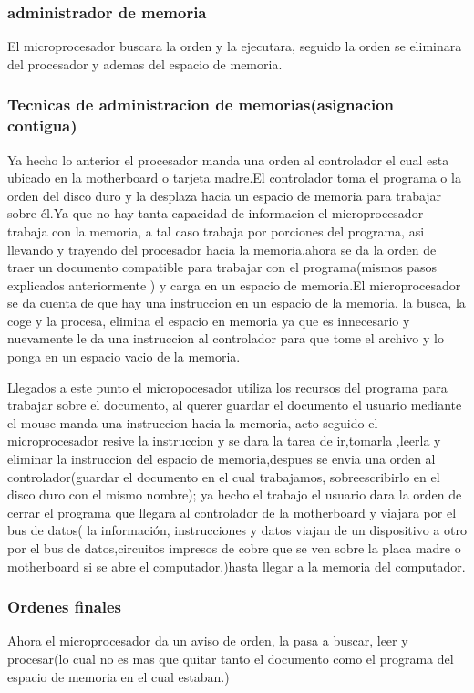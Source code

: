 \documentclass{article}
\begin{document}
    
        \subsubsection{administrador de memoria}El microprocesador buscara la orden y la ejecutara, seguido la orden se eliminara del procesador y ademas del espacio de memoria.
    
        \subsubsection{Tecnicas de administracion de memorias(asignacion contigua)}   Ya hecho lo anterior el procesador manda una orden al controlador el cual esta ubicado en la motherboard o tarjeta madre.El controlador toma el programa o la orden del disco duro y la desplaza hacia un espacio de memoria para trabajar sobre él.Ya que no hay tanta capacidad de informacion el microprocesador trabaja con la memoria, a tal caso trabaja por porciones del programa, asi llevando y trayendo del procesador hacia la memoria,ahora se da la orden de traer un documento compatible para trabajar con el programa(mismos pasos explicados anteriormente )  y carga en un espacio de memoria.El microprocesador se da cuenta de que hay una instruccion en un espacio de la memoria, la busca, la coge y la procesa, elimina el espacio en memoria ya que es innecesario y nuevamente le da una instruccion al controlador para que tome el archivo y lo ponga en un espacio vacio de la memoria.\cite{profe}
        
        Llegados a este punto el micropocesador utiliza los recursos del programa para trabajar sobre el documento, al querer guardar el documento el usuario mediante el mouse manda una instruccion hacia la memoria, acto seguido el microprocesador resive la instruccion y se dara la tarea de ir,tomarla ,leerla y eliminar la instruccion del espacio de memoria,despues se envia  una orden al controlador(guardar el documento en el cual trabajamos, sobreescribirlo en el disco duro con el mismo nombre); ya hecho el trabajo el usuario dara la orden de cerrar el programa que llegara al controlador de la motherboard y viajara por el bus de datos( la información, instrucciones y datos viajan de un dispositivo a otro por el bus de datos,circuitos impresos de cobre que se ven sobre la placa madre o
        motherboard si se abre el computador.)hasta llegar  a la memoria del computador.\cite{profe}
        
        \subsubsection{Ordenes finales} Ahora el microprocesador da  un aviso de orden, la pasa a buscar, leer y procesar(lo cual no es mas que quitar tanto el documento como el programa del espacio de memoria en el cual estaban.)
        
\end{document}
